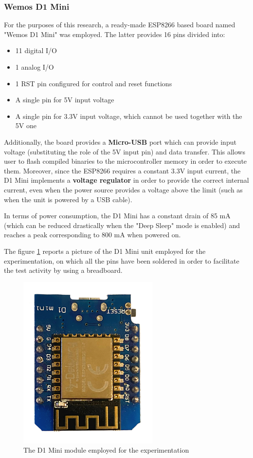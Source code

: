\subsubsection{Wemos D1 Mini}\label{subsubsec:d1mini}

For the purposes of this research, a ready-made ESP8266 based board named "Wemos D1 Mini" was employed. The latter provides 16 pins divided into:

\begin{itemize}
    \item 11 digital I/O
    \item 1 analog I/O
    \item 1 RST pin configured for control and reset functions
    \item A single pin for 5V input voltage
    \item A single pin for 3.3V input voltage, which cannot be used together with the 5V one
\end{itemize}

Additionally, the board provides a \textbf{Micro-USB} port which can provide input voltage (substituting the role of the 5V input pin) and data transfer. This allows user to flash compiled binaries to the microcontroller memory in order to execute them. Moreover, since the ESP8266 requires a constant 3.3V input current, the D1 Mini implements a \textbf{voltage regulator} in order to provide the correct internal current, even when the power source provides a voltage above the limit (such as when the unit is powered by a USB cable).

In terms of power consumption, the D1 Mini has a constant drain of 85 mA (which can be reduced drastically when the "Deep Sleep" mode is enabled) and reaches a peak corresponding to 800 mA when powered on.

The figure \ref{fig:d1mini} reports a picture of the D1 Mini unit employed for the experimentation, on which all the pins have been soldered in order to facilitate the test activity by using a breadboard.

\begin{figure}[h]
    \centering
    \includegraphics[width=7cm]{./images/d1mini.png}
    \caption{The D1 Mini module employed for the experimentation}
    \label{fig:d1mini}
\end{figure}

